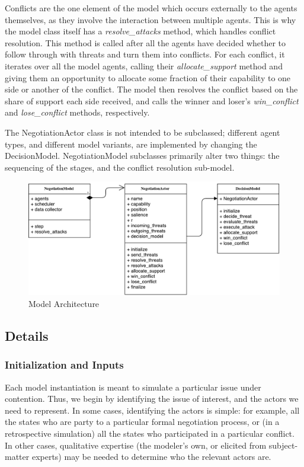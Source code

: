 Conflicts are the one element of the model which occurs externally to the agents themselves, as they involve the interaction between multiple agents. This is why the model class itself has a \emph{resolve\_attacks} method, which handles conflict resolution. This method is called after all the agents have decided whether to follow through with threats and turn them into conflicts. For each conflict, it iterates over all the model agents, calling their \emph{allocate\_support} method and giving them an opportunity to allocate some fraction of their capability to one side or another of the conflict. The model then resolves the conflict based on the share of support each side received, and calls the winner and loser's \emph{win\_conflict} and \emph{lose\_conflict} methods, respectively.

The NegotiationActor class is not intended to be subclassed; different agent types, and different model variants, are implemented by changing the DecisionModel. NegotiationModel subclasses primarily alter two things: the sequencing of the stages, and the conflict resolution sub-model.

\begin{figure}
  \centering
  \includegraphics[width=\textwidth]{BDM_Reproduction/Figures/BDM_Architecture}
  \caption{Model Architecture}
  \label{fig:bdm_architecture}
  \figSpace
\end{figure}

\subsection{Details} \label{details}

\subsubsection{Initialization and Inputs} \label{initialization}

Each model instantiation is meant to simulate a particular issue under contention. Thus, we begin by identifying the issue of interest, and the actors we need to represent. In some cases, identifying the actors is simple: for example, all the states who are party to a particular formal negotiation process, or (in a retrospective simulation) all the states who participated in a particular conflict. In other cases, qualitative expertise (the modeler's own, or elicited from subject-matter experts) may be needed to determine who the relevant actors are.

